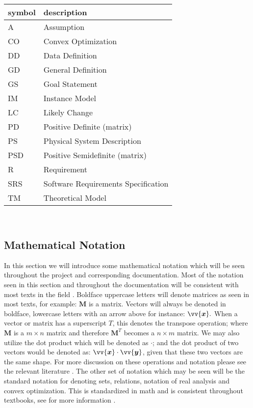 \documentclass[12pt]{article}
\begin{document}
\renewcommand{\arraystretch}{1.2}
\begin{tabular}{l l} 
  \toprule		
  \textbf{symbol} & \textbf{description}\\
  \midrule 
  A & Assumption\\
  CO & Convex Optimization\\
  DD & Data Definition\\
  GD & General Definition\\
  GS & Goal Statement\\
  IM & Instance Model\\
  LC & Likely Change\\
  PD & Positive Definite (matrix)\\
  PS & Physical System Description\\
  PSD & Positive Semidefinite (matrix)\\
  R & Requirement\\
  SRS & Software Requirements Specification\\
  TM & Theoretical Model\\
  \bottomrule
\end{tabular}\\


\subsection{Mathematical Notation}
 In this section we will introduce some mathematical notation which will be seen throughout the project and corresponding documentation. Most of the notation seen in this section and throughout the documentation will be consistent with most texts in the field \citep{strang09}. Boldface uppercase letters will denote matrices as seen in most texts, for example: $\mathbf{M}$ is a matrix. Vectors will always be denoted in boldface, lowercase letters with an arrow above for instance: $\vv{\bm{x}}.$ When a vector or matrix has a superscript $T$, this denotes the transpose operation; where $\mathbf{M}$ is a $m \times n$ matrix and therefore $\mathbf{M}^T$ becomes a $n \times m$ matrix. We may also utilize the dot product which will be denoted as $\cdot$; and the dot product of two vectors would be denoted as: $\vv{\bm{x}} \cdot \vv{\bm{y}}$, given that these two vectors are the same shape. For more discussion on these operations and notation please see the relevant literature \citep{strang09}. The other set of notation which may be seen will be the standard notation for denoting sets, relations, notation of real analysis and convex optimization. This is standardized in math and is consistent throughout textbooks, see for more information \citep{Boyd2005ConvexO}.
\end{document}
